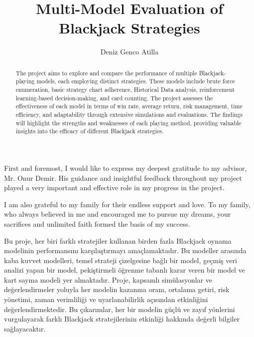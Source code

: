 \documentclass[a4paper,12pt]{report}
\title{Multi-Model Evaluation of Blackjack Strategies}
\author{Deniz Genco Atilla}
\begin{document}


\makecoverpage
    
\clearpage\mbox{}
\clearpage    
\addtocounter{page}{-1}
    
\makeapprovalpage

\begin{acknowledgements}
First and foremost, I would like to express my deepest gratitude to my advisor, Mr. Onur Demir.  His guidance and insightful feedback throughout my project played a very important and effective role in my progress in the project.

I am also grateful to my family for their endless support and love. To my family, who always believed in me and encouraged me to pursue my dreams, your sacrifices and unlimited faith formed the basis of my success.
\end{acknowledgements}

\begin{abstract}
The project aims to explore and compare the performance of multiple Blackjack-playing models, each employing distinct strategies. These models include brute force enumeration, basic strategy chart adherence, Historical Data analysis, reinforcement learning-based decision-making, and card counting. The project assesses the effectiveness of each model in terms of win rate, average return, risk management, time efficiency, and adaptability through extensive simulations and evaluations. The findings will highlight the strengths and weaknesses of each playing method, providing valuable insights into the efficacy of different Blackjack strategies.
\end{abstract}

\begin{ozet}
Bu proje, her biri farklı stratejiler kullanan birden fazla Blackjack oynama modelinin performansını karşılaştırmayı amaçlamaktadır. Bu modeller arasında kaba kuvvet modelleri, temel strateji çizelgesine bağlı bir model, geçmiş veri analizi yapan bir model, pekiştirmeli öğrenme tabanlı karar veren bir model ve kart sayma modeli yer almaktadır. Proje, kapsamlı simülasyonlar ve değerlendirmeler yoluyla her modelin kazanma oranı, ortalama getiri, risk yönetimi, zaman verimliliği ve uyarlanabilirlik açısından etkinliğini değerlendirmektedir. Bu çıkarımlar, her bir modelin güçlü ve zayıf yönlerini vurgulayarak farklı Blackjack stratejilerinin etkinliği hakkında değerli bilgiler sağlayacaktır.
\end{ozet}
\end{document}
